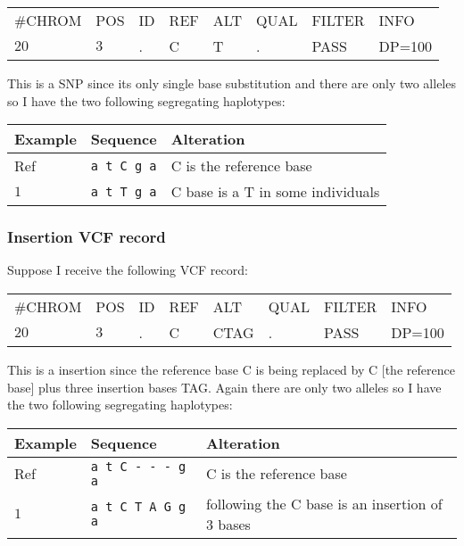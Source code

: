 \documentclass[8pt]{article}
\begin{document}
\vspace{0.3cm}
\begin{tabular}{ l l l l l l l l}
	\#CHROM & POS & ID & REF & ALT & QUAL & FILTER & INFO \\
	$20$ & $3$ & . & C & T & . & PASS & DP=100 \\
\end{tabular}
\vspace{0.3cm}

This is a SNP since its only single base substitution and there are only two alleles so I have the two following segregating haplotypes:

\vspace{0.3cm}
\begin{tabular}{ | l | l | l | }
\hline
Example & Sequence & Alteration \\ \hline
Ref & \verb|a t C g a| & C is the reference base \\ \hline
$1$ & \verb|a t T g a| & C base is a T in some individuals \\ \hline
\end{tabular}

\subsubsection{Insertion VCF record}
Suppose I receive the following VCF record:

\vspace{0.3cm}
\begin{tabular}{ l l l l l l l l}
	\#CHROM & POS & ID & REF & ALT & QUAL & FILTER & INFO \\
	$20$ & $3$ & . & C & CTAG & . & PASS & DP=100 \\
\end{tabular}
\vspace{0.3cm}

This is a insertion since the reference base C is being replaced by C [the reference base] plus three insertion bases TAG.
Again there are only two alleles so I have the two following segregating haplotypes:

\vspace{0.3cm}
\begin{tabular}{ | l | l | l | }
\hline
Example & Sequence & Alteration \\ \hline
Ref & \verb|a t C - - - g a| & C is the reference base \\ \hline
$1$ & \verb|a t C T A G g a| & following the C base is an insertion of 3 bases \\ \hline
\end{tabular}
\end{document}
